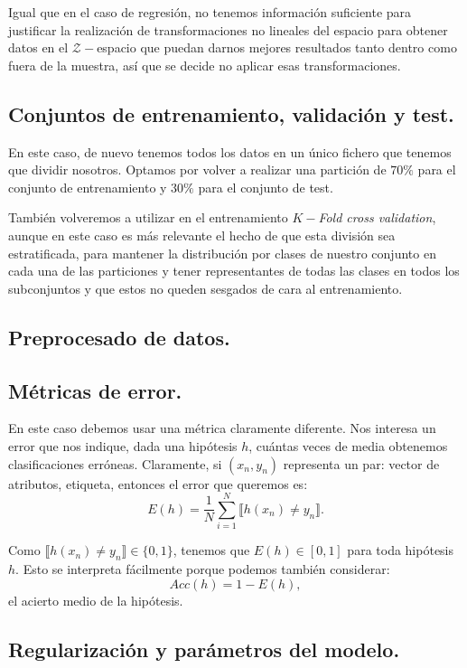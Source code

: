 \documentclass[a4paper, 20pt]{article}
\begin{document}
Igual que en el caso de regresión, no tenemos información suficiente para justificar la realización de transformaciones no lineales del espacio para obtener datos en el $\mathcal Z-$espacio que puedan darnos mejores resultados tanto dentro como fuera de la muestra, así que se decide no aplicar esas transformaciones.

\subsection{Conjuntos de entrenamiento, validación y test.}

En este caso, de nuevo tenemos todos los datos en un único fichero que tenemos que dividir nosotros. Optamos por volver a realizar una partición de $70\%$ para el conjunto de entrenamiento y $30\%$ para el conjunto de test.

También volveremos a utilizar en el entrenamiento $K-$\emph{Fold cross validation}, aunque en este caso es más relevante el hecho de que esta división sea estratificada, para mantener la distribución por clases de nuestro conjunto en cada una de las particiones y tener representantes de todas las clases en todos los subconjuntos y que estos no queden sesgados de cara al entrenamiento.

\subsection{Preprocesado de datos.}

\subsection{Métricas de error.}

En este caso debemos usar una métrica claramente diferente. Nos interesa un error que nos indique, dada una hipótesis $h$, cuántas veces de media obtenemos clasificaciones erróneas. Claramente, si $(x_n,y_n)$ representa un par: vector de atributos, etiqueta, entonces el error que queremos es:
$$
E(h) = \frac{1}{N} \sum_{i = 1}^N \llbracket h(x_n) \neq y_n \rrbracket.
$$

Como $\llbracket h(x_n) \neq y_n \rrbracket \in \{0,1\}$, tenemos que $E(h) \in [0,1]$ para toda hipótesis $h$. Esto se interpreta fácilmente porque podemos también considerar:
$$
Acc(h) = 1 - E(h),
$$
el acierto medio de la hipótesis.

\subsection{Regularización y parámetros del modelo.}
\end{document}

